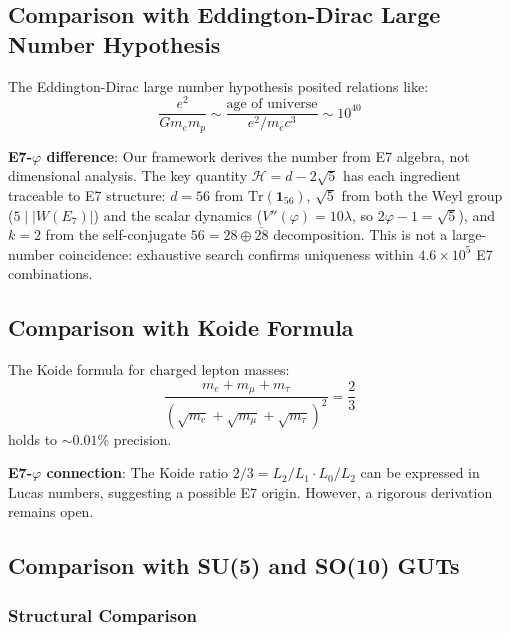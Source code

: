 \documentclass[11pt,a4paper]{article}
\begin{document}
\subsection{Comparison with Eddington-Dirac Large Number Hypothesis}

The Eddington-Dirac large number hypothesis posited relations like:
\begin{equation}
\frac{e^2}{Gm_em_p} \sim \frac{\text{age of universe}}{e^2/m_ec^3} \sim 10^{40}
\end{equation}

\textbf{E7-$\varphi$ difference}: Our framework derives the number from E7 algebra, not dimensional analysis. The key quantity $\mathcal{H} = d - 2\sqrt{5}$ has each ingredient traceable to E7 structure: $d = 56$ from $\mathrm{Tr}(\mathbf{1}_{56})$, $\sqrt{5}$ from both the Weyl group ($5 \mid |W(E_7)|$) and the scalar dynamics ($V''(\varphi) = 10\lambda$, so $2\varphi - 1 = \sqrt{5}$), and $k = 2$ from the self-conjugate $56 = 28 \oplus \overline{28}$ decomposition. This is not a large-number coincidence: exhaustive search confirms uniqueness within $4.6 \times 10^5$ E7 combinations.

\subsection{Comparison with Koide Formula}

The Koide formula for charged lepton masses:
\begin{equation}
\frac{m_e + m_\mu + m_\tau}{(\sqrt{m_e} + \sqrt{m_\mu} + \sqrt{m_\tau})^2} = \frac{2}{3}
\end{equation}
holds to $\sim 0.01\%$ precision.

\textbf{E7-$\varphi$ connection}: The Koide ratio $2/3 = L_2/L_1 \cdot L_0/L_2$ can be expressed in Lucas numbers, suggesting a possible E7 origin. However, a rigorous derivation remains open.

\subsection{Comparison with SU(5) and SO(10) GUTs}

\subsubsection{Structural Comparison}
\end{document}
